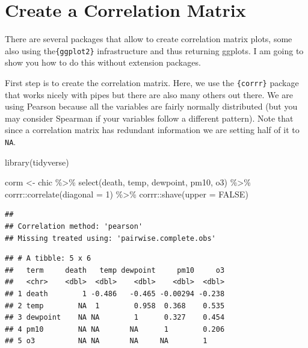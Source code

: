 \documentclass[
]{krantz}
\makeatletter
\newenvironment{Shaded}{\begin{snugshade}}{\end{snugshade}}
\newcommand{\AttributeTok}[1]{\textcolor[rgb]{0.61,0.61,0.61}{#1}}
\newcommand{\ConstantTok}[1]{\textcolor[rgb]{0,0,0}{#1}}
\newcommand{\DecValTok}[1]{\textcolor[rgb]{0.06,0.06,0.06}{#1}}
\newcommand{\FunctionTok}[1]{\textcolor[rgb]{0,0,0}{#1}}
\newcommand{\NormalTok}[1]{#1}
\newcommand{\OtherTok}[1]{\textcolor[rgb]{0.37,0.37,0.37}{#1}}
\newcommand{\SpecialCharTok}[1]{\textcolor[rgb]{0,0,0}{#1}}
\newenvironment{kframe}{%
\medskip{}
\setlength{\fboxsep}{.8em}
 \def\at@end@of@kframe{}%
 \ifinner\ifhmode%
  \def\at@end@of@kframe{\end{minipage}}%
  \begin{minipage}{\columnwidth}%
 \fi\fi%
 \def\FrameCommand##1{\hskip\@totalleftmargin \hskip-\fboxsep
 \colorbox{shadecolor}{##1}\hskip-\fboxsep
     \hskip-\linewidth \hskip-\@totalleftmargin \hskip\columnwidth}%
 \MakeFramed {\advance\hsize-\width
   \@totalleftmargin\z@ \linewidth\hsize
   \@setminipage}}%
 {\par\unskip\endMakeFramed%
 \at@end@of@kframe}
\renewenvironment{Shaded}{\begin{kframe}}{\end{kframe}}
\makeatother
\begin{document}
\hypertarget{create-a-correlation-matrix}{%
\section{Create a Correlation Matrix}\label{create-a-correlation-matrix}}

There are several packages that allow to create correlation matrix plots, some also using the\texttt{\{ggplot2\}} infrastructure and thus returning ggplots. I am going to show you how to do this without extension packages.

First step is to create the correlation matrix. Here, we use the \texttt{\{corrr\}} package that works nicely with pipes but there are also many others out there. We are using Pearson because all the variables are fairly normally distributed (but you may consider Spearman if your variables follow a different pattern). Note that since a correlation matrix has redundant information we are setting half of it to \texttt{NA}.

\begin{Shaded}
\begin{Highlighting}[]
\FunctionTok{library}\NormalTok{(tidyverse)}

\NormalTok{corm }\OtherTok{\textless{}{-}}
\NormalTok{  chic }\SpecialCharTok{\%\textgreater{}\%}
  \FunctionTok{select}\NormalTok{(death, temp, dewpoint, pm10, o3) }\SpecialCharTok{\%\textgreater{}\%}
\NormalTok{  corrr}\SpecialCharTok{::}\FunctionTok{correlate}\NormalTok{(}\AttributeTok{diagonal =} \DecValTok{1}\NormalTok{) }\SpecialCharTok{\%\textgreater{}\%}
\NormalTok{  corrr}\SpecialCharTok{::}\FunctionTok{shave}\NormalTok{(}\AttributeTok{upper =} \ConstantTok{FALSE}\NormalTok{)}
\end{Highlighting}
\end{Shaded}

\begin{verbatim}
## 
## Correlation method: 'pearson'
## Missing treated using: 'pairwise.complete.obs'
\end{verbatim}

\begin{verbatim}
## # A tibble: 5 x 6
##   term     death   temp dewpoint     pm10     o3
##   <chr>    <dbl>  <dbl>    <dbl>    <dbl>  <dbl>
## 1 death        1 -0.486   -0.465 -0.00294 -0.238
## 2 temp        NA  1        0.958  0.368    0.535
## 3 dewpoint    NA NA        1      0.327    0.454
## 4 pm10        NA NA       NA      1        0.206
## 5 o3          NA NA       NA     NA        1
\end{verbatim}
\end{document}
